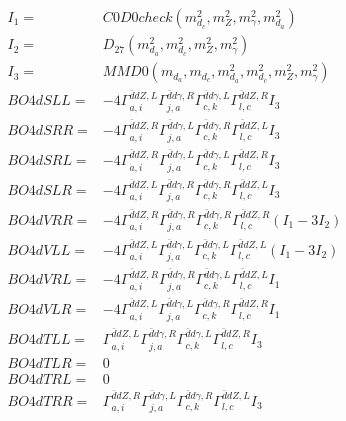 \documentclass[A4,landscape]{article}
\begin{document}
\begin{align} 
I_1 = & C0D0check(m^2_{d_{{c}}}, m^2_{Z}, m^2_{\gamma}, m^2_{d_{{a}}}) \\ 
I_2 = & D_{27}(m^2_{d_{{a}}}, m^2_{d_{{c}}}, m^2_{Z}, m^2_{\gamma}) \\ 
I_3 = & MMD0(m_{d_{{a}}}, m_{d_{{c}}}, m^2_{d_{{a}}}, m^2_{d_{{c}}}, m^2_{Z}, m^2_{\gamma}) \\ 
  BO4dSLL= & -4  \Gamma^{\bar{d}d Z ,L}_{a, i} \Gamma^{\bar{d}d \gamma ,R}_{j, a} \Gamma^{\bar{d}d \gamma ,L}_{c, k} \Gamma^{\bar{d}d Z ,R}_{l, c} I_3 \\ 
  BO4dSRR= & -4  \Gamma^{\bar{d}d Z ,R}_{a, i} \Gamma^{\bar{d}d \gamma ,L}_{j, a} \Gamma^{\bar{d}d \gamma ,R}_{c, k} \Gamma^{\bar{d}d Z ,L}_{l, c} I_3 \\ 
  BO4dSRL= & -4  \Gamma^{\bar{d}d Z ,R}_{a, i} \Gamma^{\bar{d}d \gamma ,L}_{j, a} \Gamma^{\bar{d}d \gamma ,L}_{c, k} \Gamma^{\bar{d}d Z ,R}_{l, c} I_3 \\ 
  BO4dSLR= & -4  \Gamma^{\bar{d}d Z ,L}_{a, i} \Gamma^{\bar{d}d \gamma ,R}_{j, a} \Gamma^{\bar{d}d \gamma ,R}_{c, k} \Gamma^{\bar{d}d Z ,L}_{l, c} I_3 \\ 
  BO4dVRR= & -4  \Gamma^{\bar{d}d Z ,R}_{a, i} \Gamma^{\bar{d}d \gamma ,R}_{j, a} \Gamma^{\bar{d}d \gamma ,R}_{c, k} \Gamma^{\bar{d}d Z ,R}_{l, c} (I_1 - 3 I_2) \\ 
  BO4dVLL= & -4  \Gamma^{\bar{d}d Z ,L}_{a, i} \Gamma^{\bar{d}d \gamma ,L}_{j, a} \Gamma^{\bar{d}d \gamma ,L}_{c, k} \Gamma^{\bar{d}d Z ,L}_{l, c} (I_1 - 3 I_2) \\ 
  BO4dVRL= & -4  \Gamma^{\bar{d}d Z ,R}_{a, i} \Gamma^{\bar{d}d \gamma ,R}_{j, a} \Gamma^{\bar{d}d \gamma ,L}_{c, k} \Gamma^{\bar{d}d Z ,L}_{l, c} I_1 \\ 
  BO4dVLR= & -4  \Gamma^{\bar{d}d Z ,L}_{a, i} \Gamma^{\bar{d}d \gamma ,L}_{j, a} \Gamma^{\bar{d}d \gamma ,R}_{c, k} \Gamma^{\bar{d}d Z ,R}_{l, c} I_1 \\ 
  BO4dTLL= &  \Gamma^{\bar{d}d Z ,L}_{a, i} \Gamma^{\bar{d}d \gamma ,R}_{j, a} \Gamma^{\bar{d}d \gamma ,L}_{c, k} \Gamma^{\bar{d}d Z ,R}_{l, c} I_3 \\ 
  BO4dTLR= & 0 \\ 
  BO4dTRL= & 0 \\ 
  BO4dTRR= &  \Gamma^{\bar{d}d Z ,R}_{a, i} \Gamma^{\bar{d}d \gamma ,L}_{j, a} \Gamma^{\bar{d}d \gamma ,R}_{c, k} \Gamma^{\bar{d}d Z ,L}_{l, c} I_3 \\ 
\end{align} 
\end{document}
